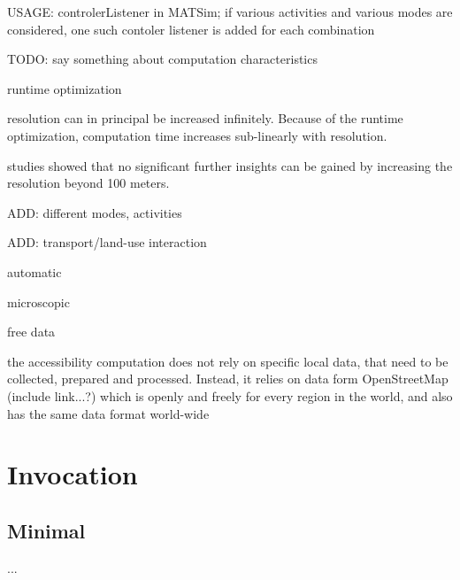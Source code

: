 USAGE: controlerListener in MATSim; if various activities and various modes are considered, one such contoler listener is added for each combination


TODO: say something about computation characteristics

runtime optimization

resolution can in principal be increased infinitely. Because of the runtime optimization, computation time increases sub-linearly with resolution.

studies showed that no significant further insights can be gained by increasing the resolution beyond 100 meters.

ADD: different modes, activities

ADD: transport/land-use interaction

automatic

microscopic

free data

the accessibility computation does not rely on specific local data, that need to be collected, prepared and processed. Instead, it relies on data form OpenStreetMap (include link...?) which is openly and freely for every region in the world, and also has the same data format world-wide










\section{Invocation}

\subsection{Minimal}

...



